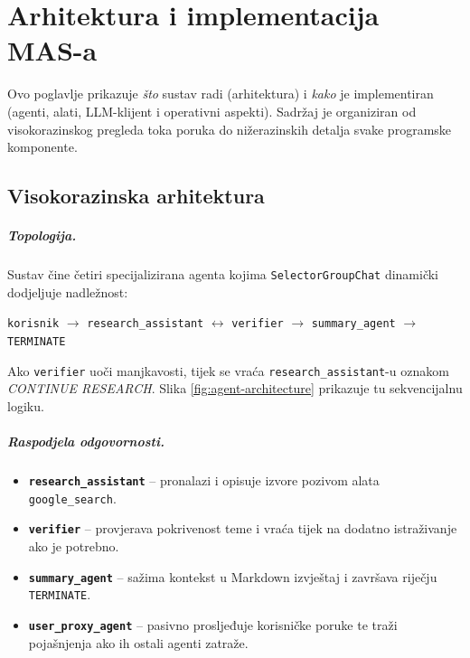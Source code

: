\documentclass[zavrsnirad]{fer}
\begin{document}
\chapter{Arhitektura i implementacija MAS-a}
\label{chap:arch-impl}

Ovo poglavlje prikazuje \emph{što} sustav radi (arhitektura) i
\emph{kako} je implementiran (agenti, alati, LLM-klijent i operativni
aspekti). Sadržaj je organiziran od visokorazinskog pregleda toka
poruka do nižerazinskih detalja svake programske komponente.

\section{Visokorazinska arhitektura}
\label{sec:arch-overview}

\paragraph{Topologija.}
Sustav čine četiri specijalizirana agenta kojima
\texttt{SelectorGroupChat} dinamički dodjeljuje nadležnost:
%
\begin{center}
\texttt{korisnik} $\rightarrow$
\texttt{research\_assistant} $\leftrightarrow$
\texttt{verifier} $\rightarrow$
\texttt{summary\_agent} $\rightarrow$
\texttt{TERMINATE}
\end{center}
%
Ako \texttt{verifier} uoči manjkavosti, tijek se vraća
\texttt{research\_assistant}-u oznakom \textit{CONTINUE RESEARCH}.
Slika \ref{fig:agent-architecture} prikazuje tu sekvencijalnu logiku.

\paragraph{Raspodjela odgovornosti.}
\begin{itemize}[label=--,leftmargin=1.5em]
  \item \textbf{\texttt{research\_assistant}} – pronalazi i opisuje
        izvore pozivom alata \texttt{google\_search}.
  \item \textbf{\texttt{verifier}} – provjerava pokrivenost teme i
        vraća tijek na dodatno istraživanje ako je potrebno.
  \item \textbf{\texttt{summary\_agent}} – sažima kontekst u Markdown
        izvještaj i završava riječju \texttt{TERMINATE}.
  \item \textbf{\texttt{user\_proxy\_agent}} – pasivno prosljeđuje
        korisničke poruke te traži pojašnjenja ako ih ostali agenti
        zatraže.
\end{itemize}
\end{document}
